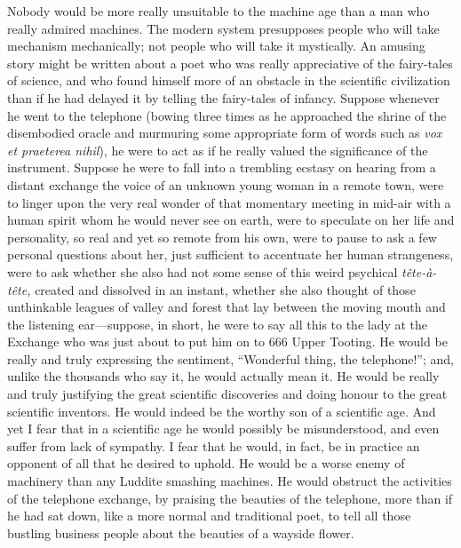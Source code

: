\documentclass{book}
\begin{document}
Nobody would be more really unsuitable to the machine age than a man who really admired machines. The modern system presupposes people who will take mechanism mechanically; not people who will take it mystically. An amusing story might be written about a poet who was really appreciative of the fairy-tales of science, and who found himself more of an obstacle in the scientific civilization than if he had delayed it by telling the fairy-tales of infancy. Suppose whenever he went to the telephone (bowing three times as he approached the shrine of the disembodied oracle and murmuring some appropriate form of words such as \emph{vox et praeterea nihil}), he were to act as if he really valued the significance of the instrument. Suppose he were to fall into a trembling ecstasy on hearing from a distant exchange the voice of an unknown young woman in a remote town, were to linger upon the very real wonder of that momentary meeting in mid-air with a human spirit whom he would never see on earth, were to speculate on her life and personality, so real and yet so remote from his own, were to pause to ask a few personal questions about her, just sufficient to accentuate her human strangeness, were to ask whether she also had not some sense of this weird psychical \emph{tête-à-tête,} created and dissolved in an instant, whether she also thought of those unthinkable leagues of valley and forest that lay between the moving mouth and the listening ear—suppose, in short, he were to say all this to the lady at the Exchange who was just about to put him on to 666 Upper Tooting. He would be really and truly expressing the sentiment, “Wonderful thing, the telephone!”; and, unlike the thousands who say it, he would actually mean it. He would be really and truly justifying the great scientific discoveries and doing honour to the great scientific inventors. He would indeed be the worthy son of a scientific age. And yet I fear that in a scientific age he would possibly be misunderstood, and even suffer from lack of sympathy. I fear that he would, in fact, be in practice an opponent of all that he desired to uphold. He would be a worse enemy of machinery than any Luddite smashing machines. He would obstruct the activities of the telephone exchange, by praising the beauties of the telephone, more than if he had sat down, like a more normal and traditional poet, to tell all those bustling business people about the beauties of a wayside flower.
\end{document}
